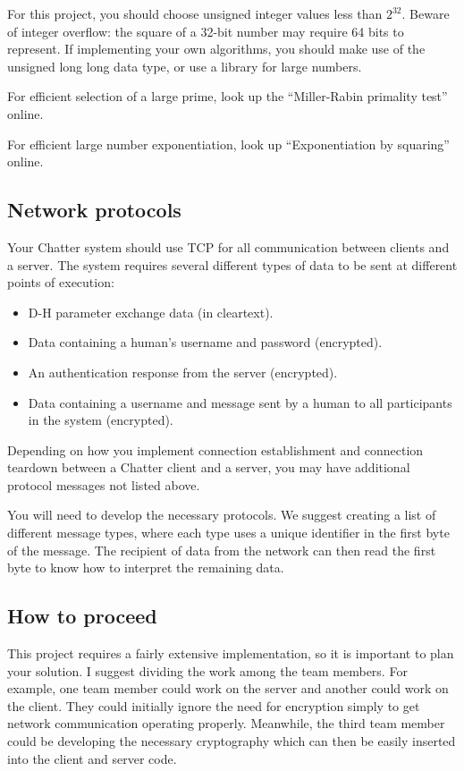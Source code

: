 \documentclass[letterpaper]{article}
\begin{document}
For this project, you should choose unsigned integer values less than $2^{32}$. Beware of
integer overflow: the square of a 32-bit number may require 64 bits to represent. If
implementing your own algorithms, you should make use of the
unsigned long long data type, or use a library for large numbers.

For efficient selection of a large prime, look up the ``Miller-Rabin primality test''
online.

For efficient large number exponentiation, look up ``Exponentiation by squaring''
online.

\subsection*{Network protocols}

Your Chatter system should use TCP for all communication between clients and a
server. The system requires several different types of data to be sent at different
points of execution:
\begin{itemize}
\item D-H parameter exchange data (in cleartext).
\item Data containing a human’s username and password (encrypted).
\item An authentication response from the server (encrypted).
\item Data containing a username and message sent by a human to all participants
in the system (encrypted).
\end{itemize}
Depending on how you implement connection establishment and connection
teardown between a Chatter client and a server, you may have additional protocol
messages not listed above.

You will need to develop the necessary protocols. We suggest creating a list of
different message types, where each type uses a unique identifier in the first byte of
the message. The recipient of data from the network can then read the first byte to
know how to interpret the remaining data.

\subsection*{How to proceed}

This project requires a fairly extensive implementation, so it is important to plan
your solution. I suggest dividing the work among the team members. For
example, one team member could work on the server and another could work on
the client. They could initially ignore the need for encryption simply to get network
communication operating properly. Meanwhile, the third team member could be
developing the necessary cryptography which can then be easily inserted into the
client and server code.
\end{document}
